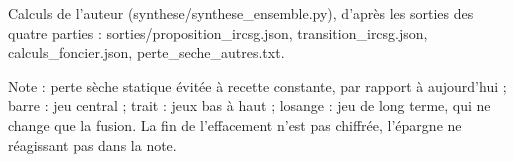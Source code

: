 Calculs de l'auteur (synthese/synthese\_ensemble.py), d'après les sorties des quatre parties : sorties/proposition\_ircsg.json, transition\_ircsg.json, calculs\_foncier.json, perte\_seche\_autres.txt.\par Note : perte sèche statique évitée à recette constante, par rapport à aujourd'hui ; barre : jeu central ; trait : jeux bas à haut ; losange : jeu de long terme, qui ne change que la fusion. La fin de l'effacement n'est pas chiffrée, l'épargne ne réagissant pas dans la note.
